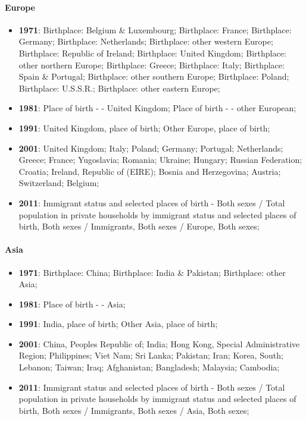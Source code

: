 \documentclass[a4paper]{article}
\begin{document}
\paragraph{Europe}
\begin{itemize}
   \item{\textbf{1971}:  Birthplace: Belgium \& Luxembourg; Birthplace: France; Birthplace: Germany; Birthplace: Netherlands; Birthplace: other western Europe; Birthplace: Republic of Ireland; Birthplace: United Kingdom; Birthplace: other northern Europe; Birthplace: Greece; Birthplace: Italy; Birthplace: Spain \& Portugal; Birthplace: other southern Europe; Birthplace: Poland; Birthplace: U.S.S.R.; Birthplace: other eastern Europe;}
   \item{\textbf{1981}:  Place of birth - - United Kingdom; Place of birth - - other European;}
   \item{\textbf{1991}:  United Kingdom, place of birth; Other Europe, place of birth;}
   \item{\textbf{2001}:  United Kingdom; Italy; Poland; Germany; Portugal; Netherlands; Greece; France; Yugoslavia; Romania; Ukraine; Hungary; Russian Federation; Croatia; Ireland, Republic of (EIRE); Bosnia and Herzegovina; Austria; Switzerland; Belgium;}
   \item{\textbf{2011}:  Immigrant status and selected places of birth - Both sexes / Total population in private households by immigrant status and selected places of birth, Both sexes / Immigrants, Both sexes / Europe, Both sexes;}
\end{itemize}

\paragraph{Asia}
\begin{itemize}
   \item{\textbf{1971}:  Birthplace: China; Birthplace: India \& Pakistan; Birthplace: other Asia;}
   \item{\textbf{1981}:  Place of birth - - Asia;}
   \item{\textbf{1991}:  India, place of birth; Other Asia, place of birth;}
   \item{\textbf{2001}:  China, Peoples Republic of; India; Hong Kong, Special Administrative Region; Philippines; Viet Nam; Sri Lanka; Pakistan; Iran; Korea, South; Lebanon; Taiwan; Iraq; Afghanistan; Bangladesh; Malaysia; Cambodia;}
   \item{\textbf{2011}:  Immigrant status and selected places of birth - Both sexes / Total population in private households by immigrant status and selected places of birth, Both sexes / Immigrants, Both sexes / Asia, Both sexes;}
\end{itemize}
\end{document}

